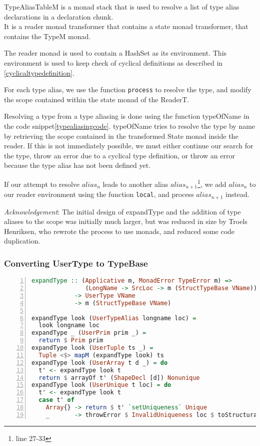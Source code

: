 TypeAliasTableM is a monad stack that is used to resolve a list of type alias
declarations in a declaration chunk. \\
It is a reader monad transformer that contains a state monad transformer, that
contains the TypeM monad.

The reader monad is used to contain a HashSet as its environment. This
environment is used to keep check of cyclical definitions as described in
\ref{cyclicaltypedefinition}.

For each type alias, we use the function \texttt{process} to resolve the type, and modify
the scope contained within the state monad of the ReaderT.

Resolving a type from a type aliasing is done using the function typeOfName in
the code snippet\ref{typealiasingcode}. typeOfName tries to
resolve the type by name by retrieving the scope contained in the transformed
State monad inside the reader. If this is not immediately possible, we must
either continue our search for the type, throw an error due to a cyclical type
definition, or throw an error because the type alias has not been defined yet.

If our attempt to resolve $alias_n$ leads to another alias
$alias_{n+1}$\footnote{line 27-33}, we add
$alias_n$ to our reader environment using the function \texttt{local}, and
process $alias_{n+1}$ instead.

\textit{Acknowledgement}: The initial design of expandType and the addition of
type aliases to the scope was initially much larger, but was reduced in size by
Troels Henriksen, who rewrote the process to use monads, and reduced some code
duplication. 

\subsubsection{Converting UserType to TypeBase}
\begin{lstlisting}[language=Haskell, numbers=left]
expandType :: (Applicative m, MonadError TypeError m) =>
               (LongName -> SrcLoc -> m (StructTypeBase VName))
            -> UserType VName
            -> m (StructTypeBase VName)

expandType look (UserTypeAlias longname loc) =
  look longname loc
expandType _ (UserPrim prim _) =
  return $ Prim prim
expandType look (UserTuple ts _) =
  Tuple <$> mapM (expandType look) ts
expandType look (UserArray t d _) = do
  t' <- expandType look t
  return $ arrayOf t' (ShapeDecl [d]) Nonunique
expandType look (UserUnique t loc) = do
  t' <- expandType look t
  case t' of
    Array{} -> return $ t' `setUniqueness` Unique
    _       -> throwError $ InvalidUniqueness loc $ toStructural t'
\end{lstlisting}

